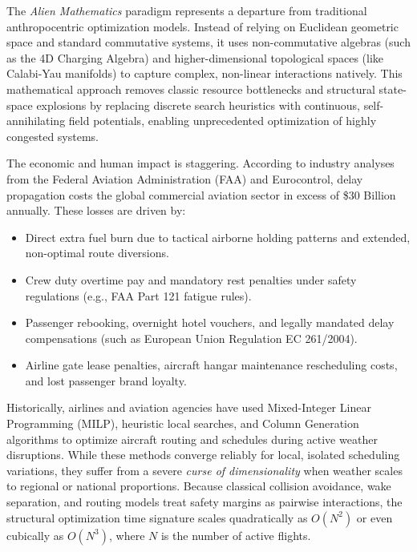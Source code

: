 \documentclass[11pt,a4paper]{book}
\begin{document}
The \textit{Alien Mathematics} paradigm represents a departure from traditional anthropocentric optimization models. Instead of relying on Euclidean geometric space and standard commutative systems, it uses non-commutative algebras (such as the 4D Charging Algebra) and higher-dimensional topological spaces (like Calabi-Yau manifolds) to capture complex, non-linear interactions natively. This mathematical approach removes classic resource bottlenecks and structural state-space explosions by replacing discrete search heuristics with continuous, self-annihilating field potentials, enabling unprecedented optimization of highly congested systems.

The economic and human impact is staggering. According to industry analyses from the Federal Aviation Administration (FAA) and Eurocontrol, delay propagation costs the global commercial aviation sector in excess of \$30 Billion annually. These losses are driven by:
\begin{itemize}
    \item Direct extra fuel burn due to tactical airborne holding patterns and extended, non-optimal route diversions.
    \item Crew duty overtime pay and mandatory rest penalties under safety regulations (e.g., FAA Part 121 fatigue rules).
    \item Passenger rebooking, overnight hotel vouchers, and legally mandated delay compensations (such as European Union Regulation EC 261/2004).
    \item Airline gate lease penalties, aircraft hangar maintenance rescheduling costs, and lost passenger brand loyalty.
\end{itemize}

Historically, airlines and aviation agencies have used Mixed-Integer Linear Programming (MILP), heuristic local searches, and Column Generation algorithms to optimize aircraft routing and schedules during active weather disruptions. While these methods converge reliably for local, isolated scheduling variations, they suffer from a severe \textit{curse of dimensionality} when weather scales to regional or national proportions. Because classical collision avoidance, wake separation, and routing models treat safety margins as pairwise interactions, the structural optimization time signature scales quadratically as $O(N^2)$ or even cubically as $O(N^3)$, where $N$ is the number of active flights.
\end{document}
